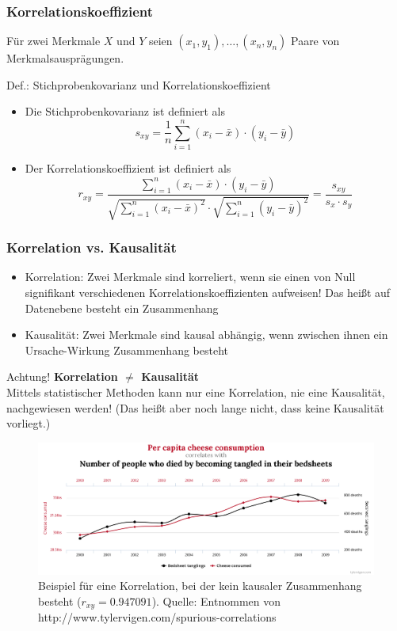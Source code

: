 \begin{frame}
\frametitle{Korrelationskoeffizient}
Für zwei Merkmale $X$ und $Y$ seien $(x_1,y_1),\ldots,(x_n,y_n)$ Paare von Merkmalsausprägungen.
\begin{block}{Def.: Stichprobenkovarianz und Korrelationskoeffizient}
\begin{itemize}
\pause
\item Die Stichprobenkovarianz ist definiert als
\[
s_{xy} = \frac{1}{n}\sum\limits_{i=1}^n (x_i-\bar{x})\cdot(y_i-\bar{y})
\]
\pause
\item Der Korrelationskoeffizient ist definiert als
\[
r_{xy} = \frac{\sum\limits_{i=1}^n (x_i-\bar{x})\cdot(y_i-\bar{y})}{\sqrt{\sum\limits_{i=1}^n (x_i-\bar{x})^2}\cdot \sqrt{\sum\limits_{i=1}^n (y_i-\bar{y})^2}} = \frac{s_{xy}}{s_x\cdot s_y}
\]
\end{itemize}
\end{block}
\end{frame}
\begin{frame}
\frametitle{Korrelation vs. Kausalität}
\begin{itemize}[<+->]
\item Korrelation: Zwei Merkmale sind korreliert, wenn sie einen von Null signifikant verschiedenen Korrelationskoeffizienten aufweisen! Das heißt auf Datenebene besteht ein Zusammenhang
\item Kausalität: Zwei Merkmale sind kausal abhängig, wenn zwischen ihnen ein Ursache-Wirkung Zusammenhang besteht
\end{itemize}
\pause
\begin{block}{Achtung!}
\textbf{Korrelation $\neq$ Kausalität}\\
Mittels statistischer Methoden kann nur eine Korrelation, nie eine Kausalität, nachgewiesen werden! (Das heißt aber noch lange nicht, dass keine Kausalität vorliegt.)
\end{block}
\end{frame}
\begin{frame}
\begin{figure}[hbtp]
\centering
\includegraphics[scale=0.2]{images/chart-korrelation.png}
\caption{Beispiel für eine Korrelation, bei der kein kausaler Zusammenhang besteht ($r_{xy} = 0.947091$). Quelle: Entnommen von http://www.tylervigen.com/spurious-correlations}
\end{figure}
\end{frame}

